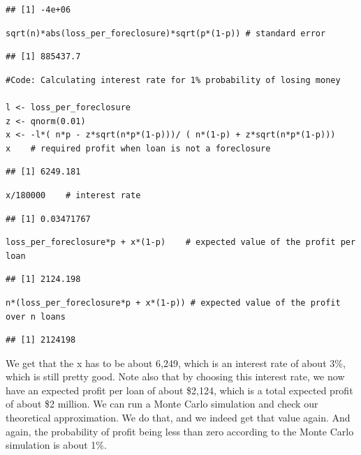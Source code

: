 \documentclass[
]{article}
\begin{document}
\begin{verbatim}
## [1] -4e+06
\end{verbatim}

\begin{verbatim}
sqrt(n)*abs(loss_per_foreclosure)*sqrt(p*(1-p)) # standard error 
\end{verbatim}

\begin{verbatim}
## [1] 885437.7
\end{verbatim}

\begin{verbatim}
#Code: Calculating interest rate for 1% probability of losing money

l <- loss_per_foreclosure
z <- qnorm(0.01)
x <- -l*( n*p - z*sqrt(n*p*(1-p)))/ ( n*(1-p) + z*sqrt(n*p*(1-p)))
x    # required profit when loan is not a foreclosure
\end{verbatim}

\begin{verbatim}
## [1] 6249.181
\end{verbatim}

\begin{verbatim}
x/180000    # interest rate
\end{verbatim}

\begin{verbatim}
## [1] 0.03471767
\end{verbatim}

\begin{verbatim}
loss_per_foreclosure*p + x*(1-p)    # expected value of the profit per loan
\end{verbatim}

\begin{verbatim}
## [1] 2124.198
\end{verbatim}

\begin{verbatim}
n*(loss_per_foreclosure*p + x*(1-p)) # expected value of the profit over n loans
\end{verbatim}

\begin{verbatim}
## [1] 2124198
\end{verbatim}

We get that the x has to be about 6,249, which is an interest rate of
about 3\%, which is still pretty good. Note also that by choosing this
interest rate, we now have an expected profit per loan of about \$2,124,
which is a total expected profit of about \$2 million. We can run a
Monte Carlo simulation and check our theoretical approximation. We do
that, and we indeed get that value again. And again, the probability of
profit being less than zero according to the Monte Carlo simulation is
about 1\%.
\end{document}

